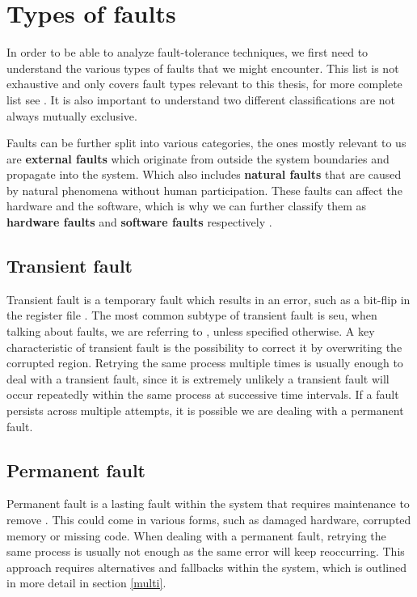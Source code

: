 \section{Types of faults}

In order to be able to analyze fault-tolerance techniques, we first need to understand the various types of faults that we might encounter. This list is not exhaustive and only covers fault types relevant to this thesis, for more complete list see \cite{1335465}. It is also important to understand two different classifications are not always mutually exclusive.

Faults can be further split into various categories, the ones mostly relevant to us are \textbf{external faults} which originate from outside the system boundaries and propagate into the system. Which also includes \textbf{natural faults} that are caused by natural phenomena without human participation. These faults can affect the hardware and the software, which is why we can further classify them as \textbf{hardware faults} and \textbf{software faults} respectively \cite{1335465}. \\

\subsection{Transient fault} 
Transient fault is a temporary fault which results in an error, such as a bit-flip in the register file \cite{shubu}. The most common subtype of transient fault is \acrfull{seu}, when talking about faults, we are referring to , unless specified otherwise. A key characteristic of transient fault is the possibility to correct it by overwriting the corrupted region. Retrying the same process multiple times is usually enough to deal with a transient fault, since it is extremely unlikely a transient fault will occur repeatedly within the same process at successive time intervals. If a fault persists across multiple attempts, it is possible we are dealing with a permanent fault. \\

\subsection{Permanent fault} 
Permanent fault is a lasting fault within the system that requires maintenance to remove \cite{shubu}. This could come in various forms, such as damaged hardware, corrupted memory or missing code. When dealing with a permanent fault, retrying the same process is usually not enough as the same error will keep reoccurring. This approach requires alternatives and fallbacks within the system, which is outlined in more detail in section \ref{multi}. \\

